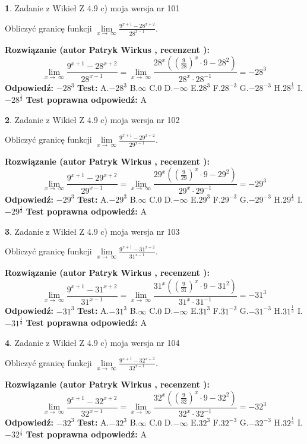 \documentclass[12pt, a4paper]{article}
\theoremstyle{definition} %
\newtheorem{zad}{}
\newcommand{\zadStart}[1]{\begin{zad}#1\newline}
\newcommand{\zadStop}{\end{zad}}
\newcommand{\rozwStart}[2]{\noindent \textbf{Rozwiązanie (autor #1 , recenzent #2): }\newline}
\newcommand{\rozwStop}{\newline}
\newcommand{\odpStart}{\noindent \textbf{Odpowiedź:}\newline}
\newcommand{\odpStop}{\newline}
\newcommand{\testStart}{\noindent \textbf{Test:}\newline}
\newcommand{\testStop}{\newline}
\newcommand{\kluczStart}{\noindent \textbf{Test poprawna odpowiedź:}\newline}
\newcommand{\kluczStop}{\newline}
\begin{document}
\zadStart{Zadanie z Wikieł Z 4.9 c) moja wersja nr 101}


Obliczyć granicę funkcji  $\lim\limits_{x\to\ \infty}\frac{9^{x+1}-28^{x+2}}{28^{x-1}}$.
\zadStop
\rozwStart{Patryk Wirkus}{}
$$\lim\limits_{x\to\ \infty}\frac{9^{x+1}-28^{x+2}}{28^{x-1}}=\lim\limits_{x\to\ \infty}\frac{28^{x}((\frac{9}{28})^{x}\cdot 9 -28^{2})}{28^{x}\cdot 28^{-1}} = -28^{3}$$
\rozwStop
\odpStart
$-28^{3}$
\odpStop
\testStart
A.$-28^{3}$ B.$\infty$ C.$0$ D.$-\infty$ E.$28^{3}$
F.$28^{-3}$ G.$-28^{-3}$
H.$28^{\frac{1}{3}}$
I.$-28^{\frac{1}{3}}$
\testStop
\kluczStart
A
\kluczStop



\zadStart{Zadanie z Wikieł Z 4.9 c) moja wersja nr 102}


Obliczyć granicę funkcji  $\lim\limits_{x\to\ \infty}\frac{9^{x+1}-29^{x+2}}{29^{x-1}}$.
\zadStop
\rozwStart{Patryk Wirkus}{}
$$\lim\limits_{x\to\ \infty}\frac{9^{x+1}-29^{x+2}}{29^{x-1}}=\lim\limits_{x\to\ \infty}\frac{29^{x}((\frac{9}{29})^{x}\cdot 9 -29^{2})}{29^{x}\cdot 29^{-1}} = -29^{3}$$
\rozwStop
\odpStart
$-29^{3}$
\odpStop
\testStart
A.$-29^{3}$ B.$\infty$ C.$0$ D.$-\infty$ E.$29^{3}$
F.$29^{-3}$ G.$-29^{-3}$
H.$29^{\frac{1}{3}}$
I.$-29^{\frac{1}{3}}$
\testStop
\kluczStart
A
\kluczStop



\zadStart{Zadanie z Wikieł Z 4.9 c) moja wersja nr 103}


Obliczyć granicę funkcji  $\lim\limits_{x\to\ \infty}\frac{9^{x+1}-31^{x+2}}{31^{x-1}}$.
\zadStop
\rozwStart{Patryk Wirkus}{}
$$\lim\limits_{x\to\ \infty}\frac{9^{x+1}-31^{x+2}}{31^{x-1}}=\lim\limits_{x\to\ \infty}\frac{31^{x}((\frac{9}{31})^{x}\cdot 9 -31^{2})}{31^{x}\cdot 31^{-1}} = -31^{3}$$
\rozwStop
\odpStart
$-31^{3}$
\odpStop
\testStart
A.$-31^{3}$ B.$\infty$ C.$0$ D.$-\infty$ E.$31^{3}$
F.$31^{-3}$ G.$-31^{-3}$
H.$31^{\frac{1}{3}}$
I.$-31^{\frac{1}{3}}$
\testStop
\kluczStart
A
\kluczStop



\zadStart{Zadanie z Wikieł Z 4.9 c) moja wersja nr 104}


Obliczyć granicę funkcji  $\lim\limits_{x\to\ \infty}\frac{9^{x+1}-32^{x+2}}{32^{x-1}}$.
\zadStop
\rozwStart{Patryk Wirkus}{}
$$\lim\limits_{x\to\ \infty}\frac{9^{x+1}-32^{x+2}}{32^{x-1}}=\lim\limits_{x\to\ \infty}\frac{32^{x}((\frac{9}{32})^{x}\cdot 9 -32^{2})}{32^{x}\cdot 32^{-1}} = -32^{3}$$
\rozwStop
\odpStart
$-32^{3}$
\odpStop
\testStart
A.$-32^{3}$ B.$\infty$ C.$0$ D.$-\infty$ E.$32^{3}$
F.$32^{-3}$ G.$-32^{-3}$
H.$32^{\frac{1}{3}}$
I.$-32^{\frac{1}{3}}$
\testStop
\kluczStart
A
\kluczStop
\end{document}
